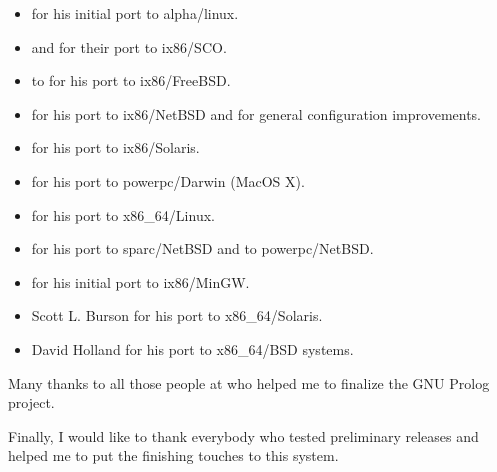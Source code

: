 \begin{itemize}

\item {} for his initial port to
alpha/linux.

\item {} and
 for their port to 
ix86/SCO.

\item {} to for his port to
ix86/FreeBSD.

\item {} for his port to
ix86/NetBSD and for general configuration improvements.

\item {} for
his port to ix86/Solaris.

\item {} for his port to 
powerpc/Darwin (MacOS X).

\item {} for his port to
x86\_64/Linux.

\item {} for his port to
sparc/NetBSD and to powerpc/NetBSD.

\item {} for his initial port to
ix86/MinGW.

\item {} {Scott L. Burson} for his port to x86\_64/Solaris.

\item {} {David Holland} for his port to x86\_64/BSD systems.

\end{itemize}

Many thanks to all those people at  who helped
me to finalize the GNU Prolog project.

Finally, I would like to thank everybody who tested preliminary releases and
helped me to put the finishing touches to this system.


